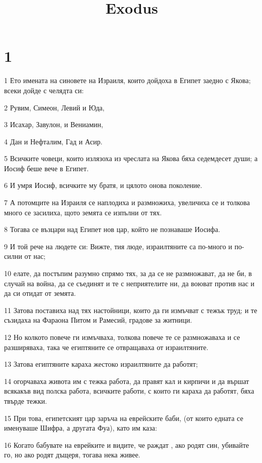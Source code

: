 

\title{Exodus}


\chapter{1}

\par 1 Ето имената на синовете на Израиля, които дойдоха в Египет заедно с Якова; всеки дойде с челядта си:
\par 2 Рувим, Симеон, Левий и Юда,
\par 3 Исахар, Завулон, и Вениамин,
\par 4 Дан и Нефталим, Гад и Асир.
\par 5 Всичките човеци, които излязоха из чреслата на Якова бяха седемдесет души; а Иосиф беше вече в Египет.
\par 6 И умря Иосиф, всичките му братя, и цялото онова поколение.
\par 7 А потомците на Израиля се наплодиха и размножиха, увеличиха се и толкова много се засилиха, щото земята се изпълни от тях.
\par 8 Тогава се възцари над Египет нов цар, който не познаваше Иосифа.
\par 9 И той рече на людете си: Вижте, тия люде, израилтяните са по-много и по-силни от нас;
\par 10 елате, да постъпим разумно спрямо тях, за да се не размножават, да не би, в случай на война, да се съединят и те с неприятелите ни, да воюват против нас и да си отидат от земята.
\par 11 Затова поставиха над тях настойници, които да ги измъчват с тежък труд; и те съзидаха на Фараона Питом и Рамесий, градове за житници.
\par 12 Но колкото повече ги измъчваха, толкова повече те се размножаваха и се разширяваха, така че египтяните се отвращаваха от израилтяните.
\par 13 Затова египтяните караха жестоко израилтяните да работят;
\par 14 огорчаваха живота им с тежка работа, да правят кал и кирпичи и да вършат всякакъв вид полска работа, всичките работи, с които ги караха да работят, бяха твърде тежки.
\par 15 При това, египетският цар заръча на еврейските баби, (от които едната се именуваше Шифра, а другата Фуа), като им каза:
\par 16 Когато бабувате на еврейките и видите, че раждат , ако родят син, убивайте го, но ако родят дъщеря, тогава нека живее.
